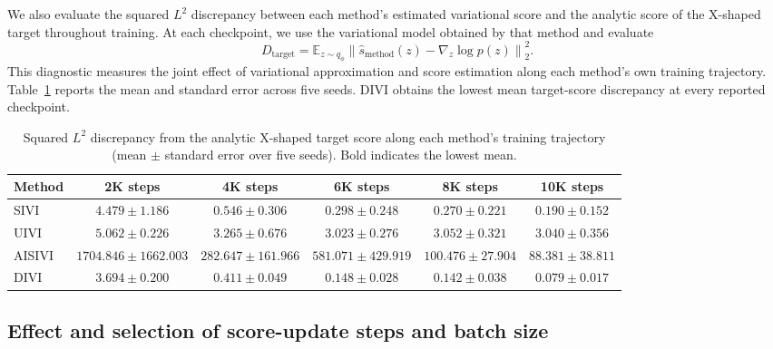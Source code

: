 We also evaluate the squared $L^2$ discrepancy between each method's estimated variational score and the analytic score of the X-shaped target throughout training. At each checkpoint, we use the variational model obtained by that method and evaluate
\begin{equation}
  D_{\mathrm{target}}
  = \mathbb{E}_{z\sim q_\phi}
    \left\|\widehat{s}_{\mathrm{method}}(z)-\nabla_z\log p(z)\right\|_2^2.
\end{equation}
This diagnostic measures the joint effect of variational approximation and score estimation along each method's own training trajectory. Table~\ref{tab:target-score-discrepancy} reports the mean and standard error across five seeds. DIVI obtains the lowest mean target-score discrepancy at every reported checkpoint.

\begin{table}[!htbp]
\centering
\caption{Squared $L^2$ discrepancy from the analytic X-shaped target score along each method's training trajectory (mean $\pm$ standard error over five seeds). Bold indicates the lowest mean.}
\label{tab:target-score-discrepancy}
\small
\setlength{\tabcolsep}{3pt}
\begin{adjustbox}{max width=\linewidth}
\begin{tabular}{lccccc}
\toprule
Method & 2K steps & 4K steps & 6K steps & 8K steps & 10K steps \\
\midrule
SIVI & $4.479\pm1.186$ & $0.546\pm0.306$ & $0.298\pm0.248$ & $0.270\pm0.221$ & $0.190\pm0.152$ \\
UIVI & $5.062\pm0.226$ & $3.265\pm0.676$ & $3.023\pm0.276$ & $3.052\pm0.321$ & $3.040\pm0.356$ \\
AISIVI & $1704.846\pm1662.003$ & $282.647\pm161.966$ & $581.071\pm429.919$ & $100.476\pm27.904$ & $88.381\pm38.811$ \\
DIVI & $\mathbf{3.694\pm0.200}$ & $\mathbf{0.411\pm0.049}$ & $\mathbf{0.148\pm0.028}$ & $\mathbf{0.142\pm0.038}$ & $\mathbf{0.079\pm0.017}$ \\
\bottomrule
\end{tabular}
\end{adjustbox}
\end{table}

\subsection{Effect and selection of score-update steps and batch size}
\label{app:reverse-updates}

